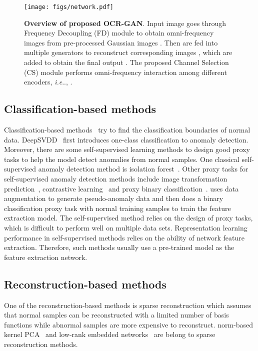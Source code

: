 \documentclass[lettersize,journal]{IEEEtran}
\makeatletter
\DeclareRobustCommand\onedot{\futurelet\@let@token\@onedot}
\def\@onedot{\ifx\@let@token.\else.\null\fi\xspace}
\def\ie{\emph{i.e}\onedot} \def\Ie{\emph{I.e}\onedot}
\makeatother
\begin{document}
\begin{figure*}[ht]
    \centering
    \texttt{[image: figs/network.pdf]}
    \caption{\textbf{Overview of proposed OCR-GAN}. Input image  goes through Frequency Decoupling (FD) module to obtain omni-frequency images  from pre-processed Gaussian images . Then  are fed into multiple generators  to reconstruct corresponding images , which are added to obtain the final output . The proposed Channel Selection (CS) module performs omni-frequency interaction among different encoders, \ie, .}
    \label{fig:network}
\end{figure*}

\subsection{Classification-based methods}
Classification-based methods~\cite{ju2015image} try to find the classification boundaries of normal data. DeepSVDD~\cite{ruff2018deep} first introduces one-class classification to anomaly detection. 
Moreover, there are some self-supervised learning methods to design good proxy tasks to help the model detect anomalies from normal samples. One classical self-supervised anomaly detection method is isolation forest~\cite{liu2008isolation}. 
Other proxy tasks for self-supervised anomaly detection methods include image transformation prediction~\cite{golan2018deep,bergman2019classification }, contrastive learning~\cite{tack2020csi} and proxy binary classification~\cite{li2021cutpaste}. \cite{li2021cutpaste} uses data augmentation to generate pseudo-anomaly data and then does a binary classification proxy task with normal training samples to train the feature extraction model. The self-supervised method relies on the design of proxy tasks, which is difficult to perform well on multiple data sets. Representation learning performance in self-supervised methods relies on the ability of network feature extraction. Therefore, such methods usually use a pre-trained model as the feature extraction network.

\subsection{Reconstruction-based methods}
One of the reconstruction-based methods is sparse reconstruction which assumes that normal samples can be reconstructed with a limited number of basis functions while abnormal samples are more expensive to reconstruct.  norm-based kernel PCA~\cite{xiao2013l1} and low-rank embedded networks~\cite{jiang2021lren} are belong to sparse reconstruction methods.
\end{document}
